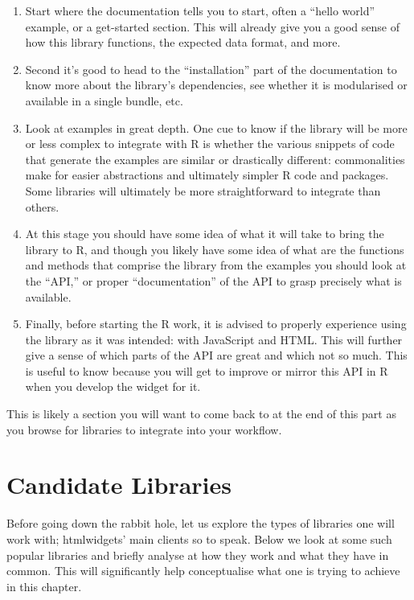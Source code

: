 \documentclass[
]{krantz}
\providecommand{\tightlist}{%
  \setlength{\itemsep}{0pt}\setlength{\parskip}{0pt}}
\begin{document}
\begin{enumerate}
\def\labelenumi{\arabic{enumi}.}
\tightlist
\item
  Start where the documentation tells you to start, often a ``hello world'' example, or a get-started section. This will already give you a good sense of how this library functions, the expected data format, and more.
\item
  Second it's good to head to the ``installation'' part of the documentation to know more about the library's dependencies, see whether it is modularised or available in a single bundle, etc.
\item
  Look at examples in great depth. One cue to know if the library will be more or less complex to integrate with R is whether the various snippets of code that generate the examples are similar or drastically different: commonalities make for easier abstractions and ultimately simpler R code and packages. Some libraries will ultimately be more straightforward to integrate than others.
\item
  At this stage you should have some idea of what it will take to bring the library to R, and though you likely have some idea of what are the functions and methods that comprise the library from the examples you should look at the ``API,'' or proper ``documentation'' of the API to grasp precisely what is available.
\item
  Finally, before starting the R work, it is advised to properly experience using the library as it was intended: with JavaScript and HTML. This will further give a sense of which parts of the API are great and which not so much. This is useful to know because you will get to improve or mirror this API in R when you develop the widget for it.
\end{enumerate}

This is likely a section you will want to come back to at the end of this part as you browse for libraries to integrate into your workflow.

\hypertarget{widgets-basics-candidates}{%
\section{Candidate Libraries}\label{widgets-basics-candidates}}

Before going down the rabbit hole, let us explore the types of libraries one will work with; htmlwidgets' main clients so to speak. Below we look at some such popular libraries and briefly analyse at how they work and what they have in common. This will significantly help conceptualise what one is trying to achieve in this chapter.
\end{document}

